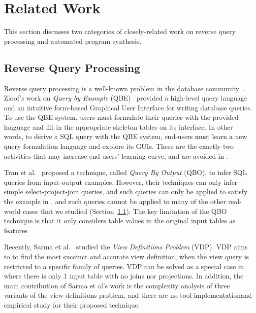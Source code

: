 
\section{Related Work}
\label{sec:related}

This section discusses two categories
of closely-related work on reverse query processing 
and automated program synthesis.


\subsection{Reverse Query Processing}

Reverse query processing is a well-known problem in the database
community~\cite{Zloof:1975, Tran:2009, DasSarma:2010}.  
Zloof's work on \textit{Query by Example} (QBE)~\cite{Zloof:1975}
provided a high-level query language and an intuitive
form-based Graphical User Interface for
writing database queries. To use the QBE system, 
users must formulate their queries with the
provided language and fill in the appropriate
skeleton tables on its interface.
In other words, to derive a SQL query with the QBE system,
end-users must learn a new query formulation language
and explore its GUIs. These are the exactly
two activities that may increase end-users' learning curve, and are avoided
in \ourtool. 



Tran et al.~\cite{Tran:2009} proposed a technique, called \textit{Query By Output} (QBO), 
to infer SQL queries from input-output examples. 
However, their techniques can only infer simple select-project-join queries,
and such queries can only be applied to satisfy the example in ,
and such queries cannot be applied to many of the other real-world cases that we
studied (Section~\ref{}). The key limitation of the QBO technique is
that it only considers table values in the original input tables as
features 


Recently, Sarma et al.~\cite{DasSarma:2010} studied the \textit{View Definitions Problem} (VDP).
VDP aims to to find the most
succinct and accurate view definition, when
the view query is restricted to a specific family of queries.
VDP can be solved as a special case in \ourtool where there is only 1
input table with no joins nor projections.
In addition, the main contribution of Sarma et al's work
is the complexity analysis of three variants of the view
definitions problem, and there are no tool implementationand empirical study
for their proposed technique.

